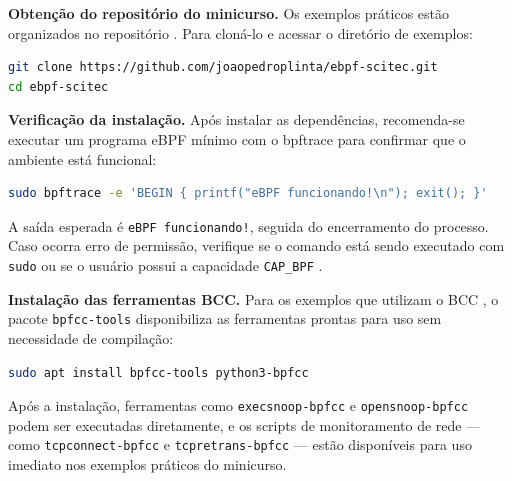 \textbf{Obtenção do repositório do minicurso.}
Os exemplos práticos estão organizados no repositório \cite{plinta2026repo}.
Para cloná-lo e acessar o diretório de exemplos:

\begin{lstlisting}[language=bash,
  caption={Clonagem do repositório e acesso ao diretório de exemplos.}]
git clone https://github.com/joaopedroplinta/ebpf-scitec.git
cd ebpf-scitec
\end{lstlisting}

\textbf{Verificação da instalação.}
Após instalar as dependências, recomenda-se executar um programa eBPF mínimo com
o bpftrace para confirmar que o ambiente está funcional:

\begin{lstlisting}[language=bash,
  caption={Verificação do ambiente com bpftrace.}]
sudo bpftrace -e 'BEGIN { printf("eBPF funcionando!\n"); exit(); }'
\end{lstlisting}

A saída esperada é \texttt{eBPF funcionando!}, seguida do encerramento do processo.
Caso ocorra erro de permissão, verifique se o comando está sendo executado com
\texttt{sudo} ou se o usuário possui a capacidade \texttt{CAP\_BPF}
\cite{linuxkernel2024}.

\textbf{Instalação das ferramentas BCC.}
Para os exemplos que utilizam o BCC \cite{bcc}, o pacote \texttt{bpfcc-tools}
disponibiliza as ferramentas prontas para uso sem necessidade de compilação:

\begin{lstlisting}[language=bash,
  caption={Instalação das ferramentas BCC.}]
sudo apt install bpfcc-tools python3-bpfcc
\end{lstlisting}

Após a instalação, ferramentas como \texttt{execsnoop-bpfcc} e
\texttt{opensnoop-bpfcc} podem ser executadas diretamente, e os scripts de
monitoramento de rede --- como \texttt{tcpconnect-bpfcc} e
\texttt{tcpretrans-bpfcc} --- estão disponíveis para uso imediato nos exemplos
práticos do minicurso.